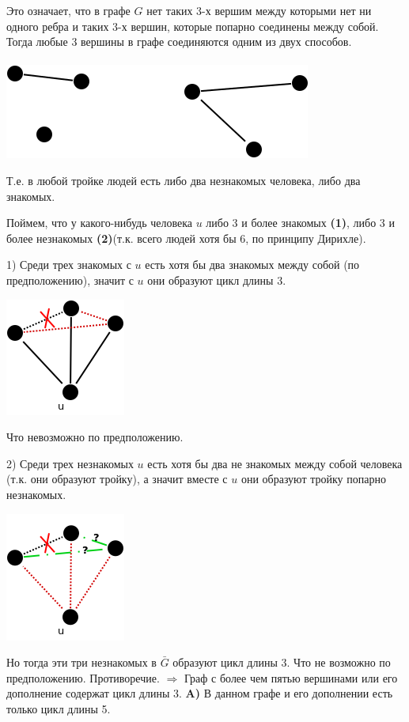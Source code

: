 \documentclass{article}
\begin{document}
Это означает, что в графе $ G $ нет таких 3-х вершим между которыми нет ни одного ребра и таких 3-х вершин, которые попарно соединены между собой.
Тогда любые 3 вершины в графе соединяются одним из двух способов.
\\
\\

\includegraphics[scale=0.5]{6_1.png} 


Т.е. в любой тройке людей есть либо два незнакомых человека, либо два знакомых. 

Поймем, что у какого-нибудь человека $u$ либо 3 и более знакомых \textbf{(1)}, либо 3 и более незнакомых \textbf{(2)}(т.к. всего людей хотя бы 6, по принципу Дирихле).

1) Среди трех знакомых с $u$ есть хотя бы два знакомых между собой (по предположению), значит с  $u$ они образуют цикл длины 3.
 
\includegraphics[scale=0.5]{6_2.png}

Что невозможно по предположению.

2) Среди трех незнакомых $u$ есть хотя бы два не знакомых между собой человека (т.к. они образуют тройку), а значит вместе с $u$ они образуют тройку попарно незнакомых.

\includegraphics[scale=0.5]{6_3.png}

Но тогда эти три незнакомых в $\bar{G}$ образуют цикл длины 3.
Что не возможно по предположению.
Противоречие. $\Rightarrow$ Граф с более чем пятью вершинами или его дополнение содержат цикл длины 3.
\newpage
\textbf{A)} В данном графе и его дополнении есть только цикл длины 5.
\end{document}
